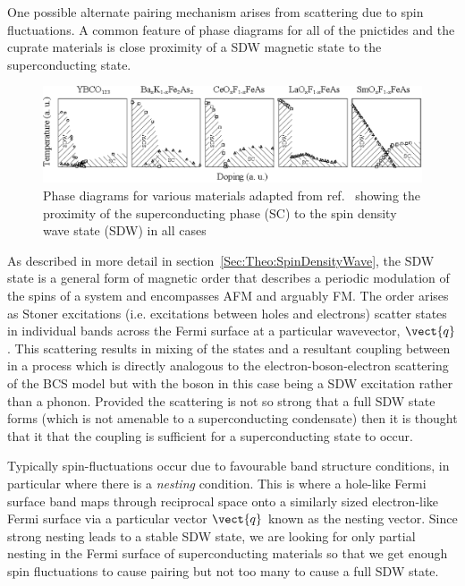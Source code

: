 One possible alternate pairing mechanism arises from scattering due to spin fluctuations. A common feature of phase diagrams for all of the pnictides and the cuprate materials is close proximity of a \ac{SDW} magnetic state to the superconducting state.
\begin{figure}[htbp]
    \begin{center}
        \includegraphics[scale=0.85]{Chapter-Introduction/Figures/PhaseDiagrams/PhaseDiagrams}
        \caption{Phase diagrams for various \highTc materials adapted from ref.~\cite{Uemura2009} showing the proximity of the superconducting phase (SC) to the spin density wave state (SDW) in all cases}
        \label{Fig:Theo:PhaseDiagrams}
    \end{center}
\end{figure}
As described in more detail in section~\ref{Sec:Theo:SpinDensityWave}, the \ac{SDW} state is a general form of magnetic order that describes a periodic modulation of the spins of a system and encompasses \ac{AFM} and arguably \ac{FM}. The order arises as Stoner excitations (i.e. excitations between holes and electrons) scatter states in individual bands across the Fermi surface at a particular wavevector, $\vect{q}$. This scattering results in mixing of the states and a resultant coupling between in a process which is directly analogous to the electron-boson-electron scattering of the \ac{BCS} model but with the boson in this case being a \ac{SDW} excitation rather than a phonon. Provided the scattering is not so strong that a full \ac{SDW} state forms (which is not amenable to a superconducting condensate) then it is thought that it that the coupling is sufficient for a superconducting state to occur.

Typically spin-fluctuations occur due to favourable band structure conditions, in particular where there is a \emph{nesting} condition. This is where a hole-like Fermi surface band maps through reciprocal space onto a similarly sized electron-like Fermi surface via a particular vector $\vect{q}$ known as the nesting vector. Since strong nesting leads to a stable \ac{SDW} state, we are looking for only partial nesting in the Fermi surface of superconducting materials so that we get enough spin fluctuations to cause pairing but not too many to cause a full \ac{SDW} state.

